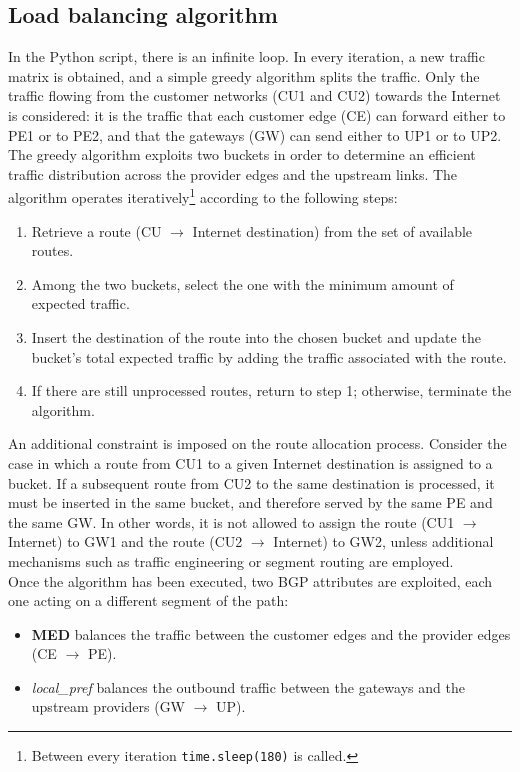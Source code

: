 \documentclass{report}
\begin{document}
\subsection{Load balancing algorithm}
In the Python script, there is an infinite loop. In every iteration, a new traffic matrix is obtained, and a simple greedy algorithm splits the traffic. Only the traffic flowing from the customer networks (CU1 and CU2) towards the Internet is considered: it is the traffic that each customer edge (CE) can forward either to PE1 or to PE2, and that the gateways (GW) can send either to UP1 or to UP2. The greedy algorithm exploits two buckets in order to determine an efficient traffic distribution across the provider edges and the upstream links. The algorithm operates iteratively\footnote{Between every iteration \texttt{time.sleep(180)} is called.} according to the following steps:
\begin{enumerate}
    \item Retrieve a route (CU $\rightarrow$ Internet destination) from the set of available routes.
    \item Among the two buckets, select the one with the minimum amount of expected traffic.
    \item Insert the destination of the route into the chosen bucket and update the bucket's total expected traffic by adding the traffic associated with the route.
    \item If there are still unprocessed routes, return to step 1; otherwise, terminate the algorithm.
\end{enumerate}
An additional constraint is imposed on the route allocation process.
Consider the case in which a route from CU1 to a given Internet destination is assigned to a bucket. If a subsequent route from CU2 to the same destination is processed, it must be inserted in the same bucket, and therefore served by the same PE and the same GW.
In other words, it is not allowed to assign the route (CU1 $\rightarrow$ Internet) to GW1 and the route (CU2 $\rightarrow$ Internet) to GW2, unless additional mechanisms such as traffic engineering or segment routing are employed.\\
Once the algorithm has been executed, two BGP attributes are exploited, each one acting on a different segment of the path:
\begin{itemize}
    \item \textbf{MED} balances the traffic between the customer edges and the provider edges (CE $\rightarrow$ PE).
    \item \textit{local\_pref} balances the outbound traffic between the gateways and the upstream providers (GW $\rightarrow$ UP).
\end{itemize}
\end{document}
